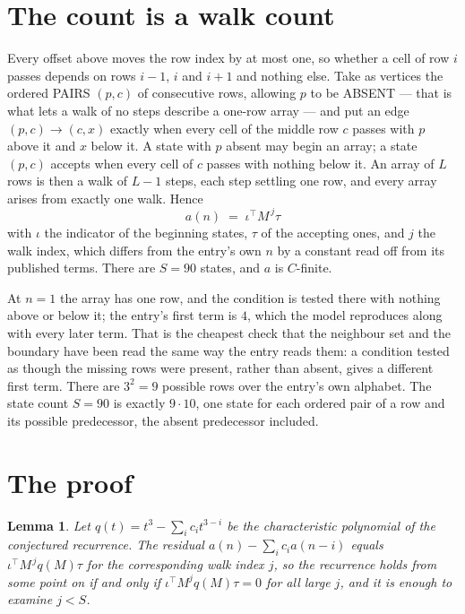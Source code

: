 \documentclass[11pt,a4paper]{article}
\theoremstyle{plain}
\newtheorem{lemma}[theorem]{Lemma}
\theoremstyle{definition}
\begin{document}
\section{The count is a walk count}

Every offset above moves the row index by at most one, so whether a cell of row $i$ passes
depends on rows $i-1$, $i$ and $i+1$ and nothing else. Take as vertices the ordered PAIRS
$(p,c)$ of consecutive rows, allowing $p$ to be ABSENT --- that is what lets a walk of no steps
describe a one-row array --- and put an edge $(p,c)\to(c,x)$ exactly when every cell of the
middle row $c$ passes with $p$ above it and $x$ below it. A state with $p$ absent may begin an
array; a state $(p,c)$ accepts when every cell of $c$ passes with nothing below it. An array of
$L$ rows is then a walk of $L-1$ steps, each step settling one row, and every array arises from
exactly one walk. Hence
\[
a(n)\;=\;\iota^{\!\top}M^{\,j}\tau
\]
with $\iota$ the indicator of the beginning states, $\tau$ of the accepting ones, and $j$ the
walk index, which differs from the entry's own $n$ by a constant read off from its published
terms. There are $S=90$ states, and $a$ is $C$-finite.

At $n=1$ the array has one row, and
the condition is tested there with nothing above or below it; the entry's first term is
$4$, which the model reproduces along with every later term. That is the cheapest check
that the neighbour set and the boundary have been read the same way the entry reads them: a
condition tested as though the missing rows were present, rather than absent, gives a different
first term. There are $3^{2}=9$ possible rows over the entry's own alphabet. The state count $S=90$ is exactly $9\cdot10$,
one state for each ordered pair of a row and its possible predecessor, the absent predecessor
included.

\section{The proof}

\begin{lemma}\label{lem:crit}
Let $q(t)=t^{3}-\sum_i c_it^{3-i}$ be the characteristic polynomial of the
conjectured recurrence. The residual $a(n)-\sum_ic_ia(n-i)$ equals
$\iota^{\!\top}M^{\,j}q(M)\tau$ for the corresponding walk index $j$, so the recurrence
holds from some point on if and only if $\iota^{\!\top}M^{j}q(M)\tau=0$ for all large $j$,
and it is enough to examine $j<S$.
\end{lemma}
\end{document}

